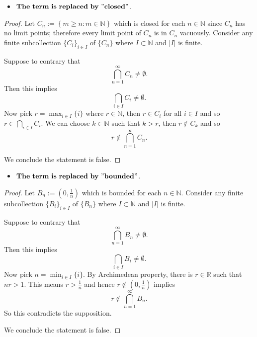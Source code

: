 \begin{Exercise}
\begin{itemize}
\item $\mathbf{The\ term\ is\ replaced\ by\ "closed"}$.
\end{itemize}
\begin{proof}
Let $C_n := \left\{m\geq n:m\in\mathbb{N}\right\}$ which is closed for each $n\in\mathbb{N}$ since $C_n$ has no limit points; therefore every limit point of $C_n$ is in $C_n$ vacuously. Consider any finite subcollection $\{C_i\}_{i\in I}$ of $\{C_n\}$ where $I\subset \mathbb{N}$ and $|I|$ is finite.

Suppose to contrary that
$$
\bigcap_{n=1}^{\infty} C_n \neq \emptyset.
$$
Then this implies
$$
\bigcap_{i\in I} C_i \neq \emptyset.
$$
Now pick $r = \max_{i\in I}\{i\}$ where $r\in\mathbb{N}$, then $r\in C_i$ for all $i\in I$ and so $r\in \bigcap_{i\in I}C_i$. We can choose $k\in\mathbb{N}$ such that $k>r$, then $r\notin C_k$ and so
$$
r \notin \bigcap_{n=1}^{\infty}C_n.
$$

We conclude the statement is false.
\end{proof}

\begin{itemize}
\item $\mathbf{The\ term\ is\ replaced\ by\ "bounded"}$.
\end{itemize}
\begin{proof}
Let $B_n := \left(0,\frac{1}{n}\right)$ which is bounded for each $n\in\mathbb{N}$. Consider any finite subcollection $\{B_i\}_{i\in I}$ of $\{B_n\}$ where $I\subset \mathbb{N}$ and $|I|$ is finite.

Suppose to contrary that
$$
\bigcap_{n=1}^{\infty} B_n \neq \emptyset.
$$
Then this implies
$$
\bigcap_{i\in I} B_i \neq \emptyset.
$$
Now pick $n = \min_{i\in I}\{i\}$. By Archimedean property, there is $r\in\mathbb{R}$ such that $n r > 1$. This means $r>\frac{1}{n}$ and hence $r\notin\left(0, \frac{1}{n} \right)$ implies
$$
r\notin \bigcap_{n=1}^{\infty} B_n.
$$
So this contradicts the supposition.

We conclude the statement is false.
\end{proof}
\end{Exercise}